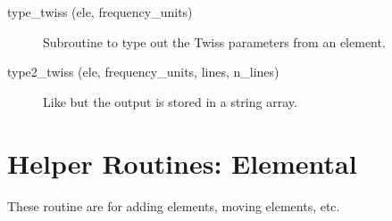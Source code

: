 \begin{description}
\item[type\_twiss (ele, frequency\_units)] \Newline
Subroutine to type out the Twiss parameters from an element. 

\item[type2\_twiss (ele, frequency\_units, lines, n\_lines)] \Newline
Like  but the output is stored in a string array. 

\end{description}

\section{Helper Routines: Elemental}
\label{r:elem}     

These routine are for adding elements, moving elements, etc.

